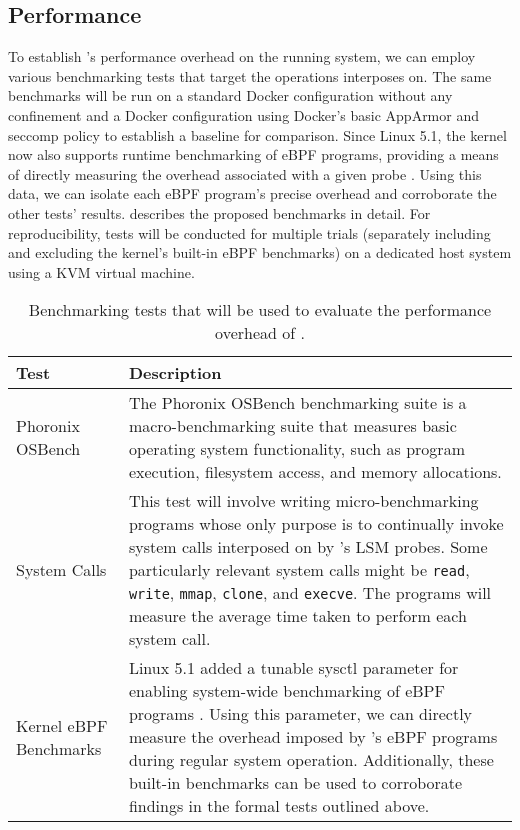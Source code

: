 \subsection{Performance}

To establish \bpfcontain{}'s performance overhead on the running system, we can employ various benchmarking tests that target the operations \bpfcontain{} interposes on. The same benchmarks will be run on a standard Docker configuration without any confinement and a Docker configuration using Docker's basic AppArmor and seccomp policy to establish a baseline for comparison. Since Linux 5.1, the kernel now also supports runtime benchmarking of eBPF programs, providing a means of directly measuring the overhead associated with a given probe \cite{starovoitov2019_bpf_benchmark}. Using this data, we can isolate each eBPF program's precise overhead and corroborate the other tests' results.  describes the proposed benchmarks in detail. For reproducibility, tests will be conducted for multiple trials (separately including and excluding the kernel's built-in eBPF benchmarks) on a dedicated host system using a KVM virtual machine.

{
\small
\begin{longtable}[c]{lp{25em}}
  \caption{
    Benchmarking tests that will be used to evaluate the performance overhead of \bpfcontain{}.
  }
  \label{tab:perf_tests}\\
  \toprule
  Test               & Description \\
  \midrule
  \endfirsthead
  Phoronix OSBench   & The Phoronix OSBench benchmarking suite \cite{phoronix} is a macro-benchmarking suite that measures basic operating system functionality, such as program execution, filesystem access, and memory allocations. \\

  System Calls       & This test will involve writing micro-benchmarking programs whose only purpose is to continually invoke system calls interposed on by \bpfcontain{}'s LSM probes. Some particularly relevant system calls might be \texttt{read}, \texttt{write}, \texttt{mmap}, \texttt{clone}, and \texttt{execve}. The programs will measure the average time taken to perform each system call. \\

  Kernel eBPF Benchmarks    & Linux 5.1 added a tunable sysctl parameter for enabling system-wide benchmarking of eBPF programs \cite{starovoitov2019_bpf_benchmark}. Using this parameter, we can directly measure the overhead imposed by \bpfcontain{}'s eBPF programs during regular system operation. Additionally, these built-in benchmarks can be used to corroborate findings in the formal tests outlined above. \\
  \bottomrule
\end{longtable}
}
